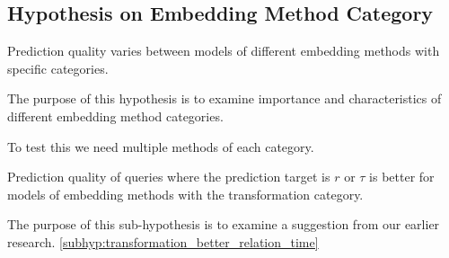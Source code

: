 \subsection{Hypothesis on Embedding Method Category}
\label{sec:hypothesis_embedding_method_category}

\begin{hypothesis}
\label{hyp:embedding_method_category}
Prediction quality varies between models of different embedding methods with specific categories.
\end{hypothesis}

The purpose of this hypothesis is to examine importance and characteristics of different embedding method categories.

To test this we need multiple methods of each category.

\begin{subhypothesis}
\label{subhyp:transformation_better_relation_time}
Prediction quality of queries where the prediction target is $r$ or $\tau$ is better for models of embedding methods with the transformation category.
\end{subhypothesis}

The purpose of this sub-hypothesis is to examine a suggestion from our earlier research.
\autoref{subhyp:transformation_better_relation_time}